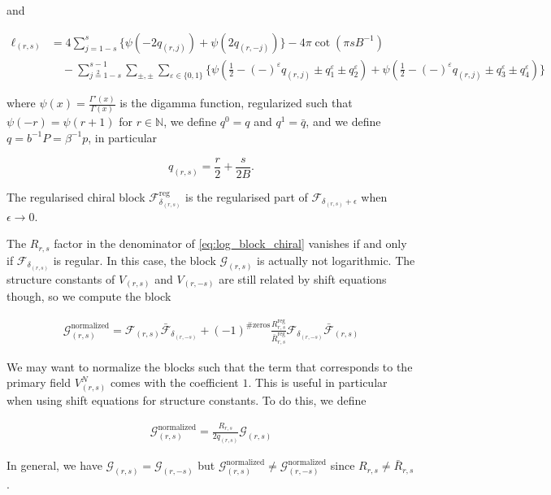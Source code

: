 \documentclass[a4paper]{article}
\numberwithin{equation}{section}
\begin{document}
and

\begin{align}
 \ell_{(r,s)} &= 4\sum_{j=1-s}^s \Big\{ \psi(-2q_{( r,j)}) +\psi(2q_{( r,-j)}) \Big\}
 - 4\pi \cot(\pi s B^{-1})
 \\
 &\quad -\sum_{j\overset{2}{=}1-s}^{s-1}\sum_{\pm,\pm} \sum_{\varepsilon\in\{0,1\}}  \Big\{
 \psi\left(\tfrac12 -(-)^\varepsilon q_{(r,j)}\pm q^\varepsilon_1\pm q^\varepsilon_2\right)
  +
 \psi\left(\tfrac12 - (-)^\varepsilon q_{(r,j)}\pm q^\varepsilon_3\pm q^\varepsilon_4\right) \Big\}
 \end{align}

where \(\psi(x) = \frac{\Gamma'(x)}{\Gamma(x)}\) is the digamma function, regularized such that \(\psi(-r)=\psi(r+1)\) for \(r\in\mathbb{N}\), we define \(q^0 = q\) and \(q^1 = \bar{q}\), and we define \(q = b^{-1}P=\beta^{-1}p\), in particular

$$
q_{(r,s)} = \frac{r}{2}+\frac{s}{2B}.
$$

The regularised chiral block \(\mathcal F^{\text{reg}}_{\delta_{(r,s)}}\) is the regularised part of \(\mathcal F_{\delta_{(r,s)} + \epsilon}\) when \(\epsilon \to 0\).

The \(R_{r,s}\) factor in the denominator of \ref{eq:log_block_chiral} vanishes if and only if \(\mathcal F_{\delta_{(r,s)}}\) is regular. In this case, the block \(\mathcal G_{(r,s)}\) is actually not logarithmic. The structure constants of \(V_{(r,s)}\) and \(V_{(r,-s)}\) are still related by shift equations though, so we compute the block

\begin{align}
\mathcal G^{{\text{normalized}}}_{(r,s)}  = \mathcal{F}_{(r,s)} \bar{\mathcal{F}}_{\delta_{(r,-s)}} + (-1)^{\# \text{zeros}} \frac{R^{\text{reg}}_{r,s}}{\bar R^{\text{reg}}_{r,s}}\mathcal{F}_{\delta_{( r,-s)}} \bar{\mathcal{F}}_{(r,s)}
\end{align}

We may want to normalize the blocks such that the term that corresponds to the primary field \(V^N_{(r,s)}\) comes with the coefficient \(1\). This is useful in particular when using shift equations for structure constants. To do this, we define

\begin{align}
\mathcal{G}_{(r,s)}^\text{normalized} = \frac{R_{r, s}}{2q_{(r,s)}} \mathcal{G}_{(r,s)}
\end{align}

In general, we have \(\mathcal{G}_{( r,s)} = \mathcal{G}_{(r,-s)}\) but \(\mathcal{G}^\text{normalized}_{(r,s)} \neq \mathcal{G}^\text{normalized}_{( r,-s)}\) since \(R_{r,s}\neq \bar R_{r,s}\).
\end{document}
